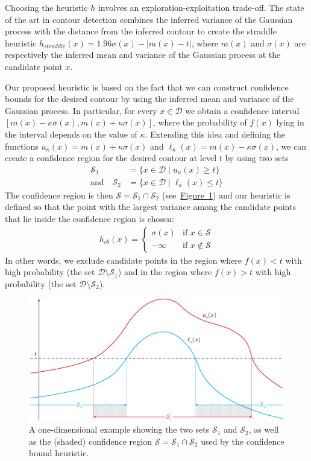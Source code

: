 \documentclass[11pt]{article} %
\newcommand{\figref}[1]{\hyperref[#1]{\mbox{Figure~\ref*{#1}}}}
\newcommand{\twopartdef}[4]
{
	\left\{
		\begin{array}{ll}
			#1 & \mbox{if } #2 \\
			#3 & \mbox{if } #4
		\end{array}
	\right.
}
\begin{document}
Choosing the heuristic $h$ involves an exploration-exploitation trade-off. The
state of the art in contour detection combines the inferred variance of the
Gaussian process with the
distance from the inferred contour to create the straddle~\cite{bryan2005}
heuristic ${h_{straddle}(x) = 1.96\sigma(x) - | m(x) - t |}$, where $m(x)$
and $\sigma(x)$ are respectively the inferred mean and variance of the Gaussian
process at the candidate point $x$.

Our proposed heuristic is based on the fact that we can construct confidence
bounds for the desired contour by using the inferred mean and variance of
the Gaussian process. In particular, for every $x \in \mathcal{D}$ we obtain
a confidence interval ${[m(x) - \kappa\sigma(x), m(x) + \kappa\sigma(x)]}$,
where the probability of $f(x)$ lying in the interval depends on the value
of $\kappa$. Extending this idea and defining the functions
$u_{\kappa}(x) = m(x) + \kappa\sigma(x)$ and
$\ell_{\kappa}(x) = m(x) - \kappa\sigma(x)$,
we can create a confidence region for
the desired contour at level $t$ by using two sets
\begin{align*}
  \mathcal{S}_1 &= \{x \in \mathcal{D} \mid u_{\kappa}(x) \geq t\}\\
  \text{and}\hspace{1em}
  \mathcal{S}_2 &= \{x \in \mathcal{D} \mid \ell_{\kappa}(x) \leq t\}
\end{align*}
The confidence region is then
$\mathcal{S} = \mathcal{S}_1\cap\mathcal{S}_2$ (see~\figref{fig:cb}) and our
heuristic is defined
so that the point with the largest variance among the candidate points that
lie inside the confidence region is chosen:
\begin{align}\label{eq:hcb}
  h_{cb}(x) = \twopartdef { \sigma(x) } {x \in \mathcal{S}} {-\infty} {x \notin \mathcal{S}}
\end{align}
In other words, we exclude candidate points in the region where
$f(x) < t$ with high probability (the set $\mathcal{D}\setminus\mathcal{S}_1$)
and in the region where $f(x) > t$ with high probability
(the set $\mathcal{D}\setminus\mathcal{S}_2$).

\begin{figure}[tb]
  \centering
  \includegraphics[width=\textwidth]{figures/cb}
  \caption{A one-dimensional example showing the two sets $\mathcal{S}_1$ and
           $\mathcal{S}_2$, as well as the (shaded) confidence region
           $\mathcal{S} = \mathcal{S}_1\cap\mathcal{S}_2$ used by the confidence
           bound heuristic.}
  \label{fig:cb}
\end{figure}
\end{document}
